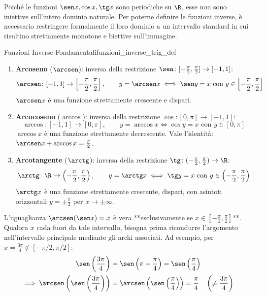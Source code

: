 Poiché le funzioni $\sen x, \cos x, \tg x$ sono periodiche su $\R$, esse non sono iniettive sull'intero dominio naturale. Per poterne definire le funzioni inverse, è necessario restringere formalmente il loro dominio a un intervallo standard in cui risultino strettamente monotone e biettive sull'immagine.

\begin{definizione}{Funzioni Inverse Fondamentali}{funzioni_inverse_trig_def}
\begin{enumerate}
    \item \textbf{Arcoseno} ($\arcsen$): inversa della restrizione $\sen \colon [-\frac{\pi}{2}, \frac{\pi}{2}] \to [-1, 1]$:
    \[
        \arcsen \colon [-1, 1] \to \left[-\frac{\pi}{2}, \frac{\pi}{2}\right], \qquad y = \arcsen x \iff \sen y = x \text{ con } y \in \left[-\frac{\pi}{2}, \frac{\pi}{2}\right]
    \]
    $\arcsen x$ è una funzione strettamente crescente e dispari.

    \item \textbf{Arcocoseno} ($\arccos$): inversa della restrizione $\cos \colon [0, \pi] \to [-1, 1]$:
    \[
        \arccos \colon [-1, 1] \to [0, \pi], \qquad y = \arccos x \iff \cos y = x \text{ con } y \in [0, \pi]
    \]
    $\arccos x$ è una funzione strettamente decrescente. Vale l'identità: $\arcsen x + \arccos x = \frac{\pi}{2}$.

    \item \textbf{Arcotangente} ($\arctg$): inversa della restrizione $\tg \colon (-\frac{\pi}{2}, \frac{\pi}{2}) \to \R$:
    \[
        \arctg \colon \R \to \left(-\frac{\pi}{2}, \frac{\pi}{2}\right), \qquad y = \arctg x \iff \tg y = x \text{ con } y \in \left(-\frac{\pi}{2}, \frac{\pi}{2}\right)
    \]
    $\arctg x$ è una funzione strettamente crescente, dispari, con asintoti orizzontali $y = \pm \frac{\pi}{2}$ per $x \to \pm \infty$.
\end{enumerate}
\end{definizione}

\begin{esame}
L'uguaglianza $\arcsen(\sen x) = x$ è vera **esclusivamente se $x \in [-\frac{\pi}{2}, \frac{\pi}{2}]$**.
Qualora $x$ cada fuori da tale intervallo, bisogna prima ricondurre l'argomento nell'intervallo principale mediante gli archi associati.
Ad esempio, per $x = \frac{3\pi}{4} \notin [-\pi/2, \pi/2]$:
\begin{align*}
    \sen\left(\frac{3\pi}{4}\right) &= \sen\left(\pi - \frac{\pi}{4}\right) = \sen\left(\frac{\pi}{4}\right) \\
    \implies \arcsen\left(\sen\left(\frac{3\pi}{4}\right)\right) &= \arcsen\left(\sen\left(\frac{\pi}{4}\right)\right) = \frac{\pi}{4} \quad \left(\neq \frac{3\pi}{4}\right)
\end{align*}
\end{esame}
